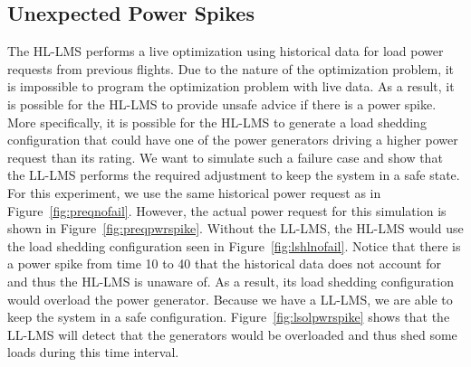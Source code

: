 \documentclass{acm_proc_article-sp}
\begin{document}
\subsection{Unexpected Power Spikes}
The HL-LMS performs a live optimization using historical data for load power requests from
previous flights. Due to the nature of the optimization problem, it is impossible to
program the optimization problem with live data. As a result, it is possible for the
HL-LMS to provide unsafe advice if there is a power spike. More specifically, it is possible
for the HL-LMS to generate a load shedding configuration that could have one of the power
generators driving a higher power request than its rating. We want to simulate such a
failure case and show that the LL-LMS performs the required adjustment to keep the system
in a safe state. For this experiment, we use the same historical power request as in
Figure~\ref{fig:preqnofail}. However, the actual power request for this simulation is shown
in Figure~\ref{fig:preqpwrspike}. Without the LL-LMS, the HL-LMS would use the load
shedding configuration seen in Figure~\ref{fig:lshlnofail}. Notice that there is a power
spike from time 10 to 40 that the historical data does not account for and thus the HL-LMS
is unaware of. As a result, its load shedding configuration would overload the power
generator. Because we have a LL-LMS, we are able to keep the system in a safe configuration.
Figure~\ref{fig:lsolpwrspike} shows that the LL-LMS will detect that the generators would
be overloaded and thus shed some loads during this time interval.
\end{document}

